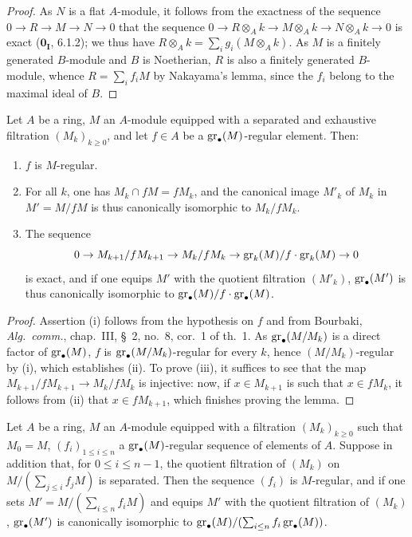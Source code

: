 \begin{proof}
As $N$ is a flat $A$-module, it follows from the exactness of the sequence $0\to R\to M\to N\to 0$ that the sequence $0\to R\otimes_Ak\to M\otimes_Ak\to N\otimes_Ak\to 0$ is exact ($\mathbf{0_I}$, 6.1.2);
we thus have $R\otimes_Ak=\sum_i g_i(M\otimes_Ak)$.
As $M$ is a finitely generated $B$-module and $B$ is Noetherian, $R$ is also a finitely generated $B$-module, whence $R=\sum_i f_iM$ by Nakayama's lemma, since the $f_i$ belong to the maximal ideal of $B$.
\end{proof}

\begin{lemma}[15.1.18]
\label{0.15.1.18}
Let $A$ be a ring, $M$ an $A$-module equipped with a separated and exhaustive filtration $(M_k)_{k\geq 0}$, and let $f\in A$ be a $\operatorname{gr}_\bullet(M)$-regular element.
Then:
\begin{enumerate}
  \item[\textup{(i)}] $f$ is $M$-regular.
  \item[\textup{(ii)}] For all $k$, one has $M_k\cap fM=fM_k$, and the canonical image $M'_k$ of $M_k$ in $M'=M/fM$ is thus canonically isomorphic to $M_k/fM_k$.
  \item[\textup{(iii)}] The sequence
  \[
    0 \to M_{k+1}/fM_{k+1} \to M_k/fM_k \to \operatorname{gr}_k(M)/f\cdot\operatorname{gr}_k(M) \to 0
  \]
  is exact, and if one equips $M'$ with the quotient filtration $(M'_k)$, $\operatorname{gr}_\bullet(M')$ is thus canonically isomorphic to $\operatorname{gr}_\bullet(M)/f\cdot\operatorname{gr}_\bullet(M)$.
\end{enumerate}
\end{lemma}

\begin{proof}
Assertion (i) follows from the hypothesis on $f$ and from Bourbaki, \emph{Alg.~comm.}, chap.~III, \S~2, no.~8, cor.~1 of th.~1.
As $\operatorname{gr}_\bullet(M/M_k)$ is a direct factor of $\operatorname{gr}_\bullet(M)$, $f$ is $\operatorname{gr}_\bullet(M/M_k)$-regular for every $k$, hence $(M/M_k)$-regular by (i), which establishes (ii).
To prove (iii), it suffices to see that the map $M_{k+1}/fM_{k+1}\to M_k/fM_k$ is injective:
now, if $x\in M_{k+1}$ is such that $x\in fM_k$, it follows from (ii) that $x\in fM_{k+1}$, which finishes proving the lemma.
\end{proof}

\begin{proposition}[15.1.19]
\label{0.15.1.19}
Let $A$ be a ring, $M$ an $A$-module equipped with a filtration $(M_k)_{k\geq 0}$ such that $M_0=M$, $(f_i)_{1\leq i\leq n}$ a $\operatorname{gr}_\bullet(M)$-regular sequence of elements of $A$.
Suppose in addition that, for $0\leq i\leq n-1$, the quotient filtration of $(M_k)$ on $M/(\sum_{j\leq i}f_jM)$ is separated.
Then the sequence $(f_i)$ is $M$-regular, and if one sets $M'=M/(\sum_{i\leq n}f_iM)$ and equips $M'$ with the quotient filtration of $(M_k)$, $\operatorname{gr}_\bullet(M')$ is canonically isomorphic to $\operatorname{gr}_\bullet(M)/(\sum_{i\leq n}f_i\operatorname{gr}_\bullet(M))$.
\end{proposition}

